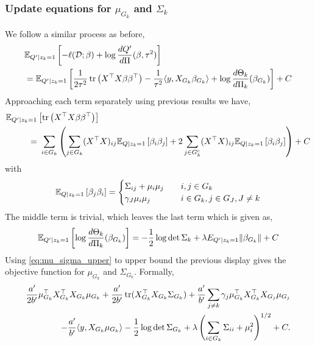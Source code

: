 \subsubsection{Update equations for $\mu_{G_k}$ and $\Sigma_{k}$}

We follow a similar process as before,
{\allowdisplaybreaks
\begin{align}
& \mathbb{E}_{Q'  | z_k = 1}  \left[ 
    - \ell(\mathcal{D}; \beta) + \log \frac{dQ'}{d\Pi}(\beta, \tau^2) 
\right]  \nonumber \\
& = 
    \mathbb{E}_{Q' | z_k = 1} \left[ 
	\frac{1}{2\tau^2} \operatorname{tr} \left( X^\top X \beta \beta^\top \right) 
	- \frac{1}{\tau^2} \langle y, X_{G_k} \beta_{G_k} \rangle 
	+ \log \frac{d\Theta_{k}}{d\Pi_k}(\beta_{G_k})
    \right] + C \label{eq:QD_mu_sigma}
\end{align}
}
Approaching each term separately using previous results we have,
\begin{align*}
    \mathbb{E}_{Q' | z_k = 1} & \left[ 
	\operatorname{tr} \left( X^\top X \beta \beta^\top \right) 
    \right] \\
=&\
    \sum_{i \in G_k} \left( 
	\sum_{j \in G_k} (X^\top X)_{ij} 
	    \mathbb{E}_{Q | z_k = 1} \left[ \beta_i \beta_j \right] 
	+ 
	2 \sum_{j \in G_k^c} (X^\top X)_{ij} 
	    \mathbb{E}_{Q | z_k = 1} \left[ \beta_i \beta_j \right] 
    \right ) + C \nonumber
\end{align*}
with
\begin{equation*}
    \mathbb{E}_{Q | z_k = 1} \left[ \beta_j \beta_i \right] = \begin{cases}
	\Sigma_{ij} + \mu_{i} \mu_{j} & \quad i,j \in G_k \\
	\gamma_J \mu_{i}\mu_{j} 	& \quad i \in G_k, j \in G_J, J \neq k
    \end{cases}
\end{equation*}
The middle term is trivial, which leaves the last term which is given as,
\begin{equation*}
    \mathbb{E}_{Q' | z_k = 1 } \left[ \log \frac{d\Theta_k}{d\Pi_k} (\beta_{G_k}) \right]
    = -\frac{1}{2} \log \det \Sigma_k + \lambda E_{Q' | z_k = 1} \| \beta_{G_k} \| + C
\end{equation*}
Using \eqref{eq:mu_sigma_upper} to upper bound the previous display gives the objective function for $\mu_{G_k}$ and $\Sigma_{G_k}$. Formally,
\begin{equation}
\begin{aligned}
    \frac{a'}{2b'} 
    \mu_{G_k}^\top X_{G_k}^\top X_{G_k} \mu_{G_k}
+
    \frac{a'}{2b'} 
    \operatorname{tr}( X_{G_k}^\top X_{G_k} \Sigma_{G_k})
+
    \frac{a'}{b'} 
    \sum_{j \neq k} 
	\gamma_j \mu_{G_k}^\top X_{G_k}^\top X_{G_j} \mu_{G_j} \\
-
    \frac{a'}{b'} 
    \langle y, X_{G_k} \mu_{G_k} \rangle 
-	
    \frac{1}{2} \log \det \Sigma_{G_k} 
+
    \lambda \left( \sum_{i \in G_k} 
	\Sigma_{ii} + \mu_i^2
    \right)^{1/2} + C.
\end{aligned}
\end{equation}
